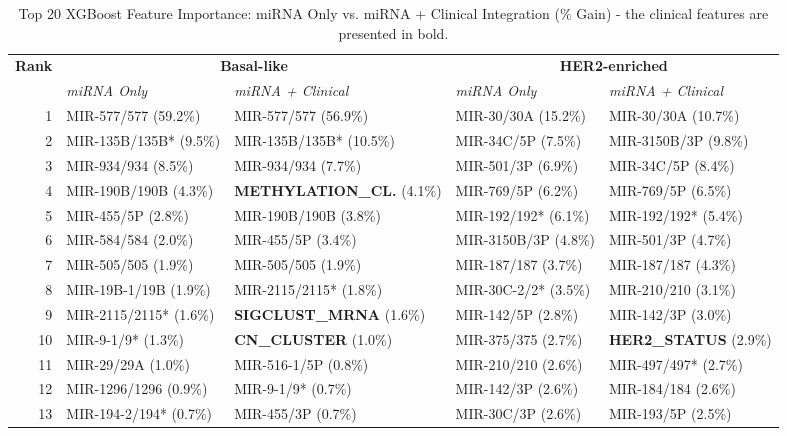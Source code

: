 \begin{table}[!ht]
\centering
\caption{Top 20 XGBoost Feature Importance: miRNA Only vs. miRNA + Clinical Integration (\% Gain) - the clinical features are presented in bold.}
\label{tab:feature_importance_percent}
\scriptsize
\begin{tabular}{r|ll|ll}
\hline
\textbf{Rank} & \multicolumn{2}{c|}{\textbf{Basal-like}} & \multicolumn{2}{c}{\textbf{HER2-enriched}} \\
& \textit{miRNA Only} & \textit{miRNA + Clinical} & \textit{miRNA Only} & \textit{miRNA + Clinical} \\ \hline
1  & MIR-577/577 (59.2\%)   & MIR-577/577 (56.9\%)   & MIR-30/30A (15.2\%)    & MIR-30/30A (10.7\%)    \\
2  & MIR-135B/135B* (9.5\%) & MIR-135B/135B* (10.5\%) & MIR-34C/5P (7.5\%)      & MIR-3150B/3P (9.8\%)   \\
3  & MIR-934/934 (8.5\%)    & MIR-934/934 (7.7\%)    & MIR-501/3P (6.9\%)      & MIR-34C/5P (8.4\%)      \\
4  & MIR-190B/190B (4.3\%)   & \textbf{METHYLATION\_CL.} (4.1\%) & MIR-769/5P (6.2\%)      & MIR-769/5P (6.5\%)      \\
5  & MIR-455/5P (2.8\%)      & MIR-190B/190B (3.8\%)   & MIR-192/192* (6.1\%)    & MIR-192/192* (5.4\%)    \\
6  & MIR-584/584 (2.0\%)     & MIR-455/5P (3.4\%)      & MIR-3150B/3P (4.8\%)    & MIR-501/3P (4.7\%)      \\
7  & MIR-505/505 (1.9\%)     & MIR-505/505 (1.9\%)     & MIR-187/187 (3.7\%)     & MIR-187/187 (4.3\%)     \\
8  & MIR-19B-1/19B (1.9\%)   & MIR-2115/2115* (1.8\%)  & MIR-30C-2/2* (3.5\%)    & MIR-210/210 (3.1\%)     \\
9  & MIR-2115/2115* (1.6\%)  & \textbf{SIGCLUST\_MRNA} (1.6\%) & MIR-142/5P (2.8\%)      & MIR-142/3P (3.0\%)      \\
10 & MIR-9-1/9* (1.3\%)      & \textbf{CN\_CLUSTER} (1.0\%) & MIR-375/375 (2.7\%)     & \textbf{HER2\_STATUS} (2.9\%) \\
11 & MIR-29/29A (1.0\%)      & MIR-516-1/5P (0.8\%)    & MIR-210/210 (2.6\%)     & MIR-497/497* (2.7\%)    \\
12 & MIR-1296/1296 (0.9\%)   & MIR-9-1/9* (0.7\%)      & MIR-142/3P (2.6\%)      & MIR-184/184 (2.6\%)     \\
13 & MIR-194-2/194* (0.7\%)  & MIR-455/3P (0.7\%)      & MIR-30C/3P (2.6\%)      & MIR-193/5P (2.5\%)      \\

\end{tabular}
\end{table}
